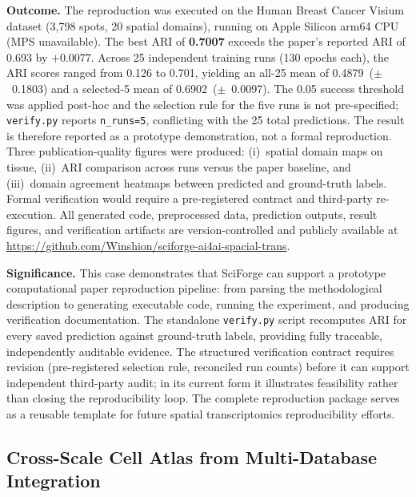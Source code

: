 \documentclass[sn-basic,Numbered,pdflatex]{sn-jnl}
\begin{document}
\textbf{Outcome.} The reproduction was executed on the Human Breast Cancer Visium dataset (3,798 spots, 20 spatial domains), running on Apple Silicon arm64 CPU (MPS unavailable). The best ARI of \textbf{0.7007} exceeds the paper's reported ARI of 0.693 by $+$0.0077. Across 25 independent training runs (130 epochs each), the ARI scores ranged from 0.126 to 0.701, yielding an all-25 mean of 0.4879~($\pm$~0.1803) and a selected-5 mean of 0.6902~($\pm$~0.0097). The 0.05 success threshold was applied post-hoc and the selection rule for the five runs is not pre-specified; \texttt{verify.py} reports \texttt{n\_runs=5}, conflicting with the 25 total predictions. The result is therefore reported as a prototype demonstration, not a formal reproduction. Three publication-quality figures were produced: (i)~spatial domain maps on tissue, (ii)~ARI comparison across runs versus the paper baseline, and (iii)~domain agreement heatmaps between predicted and ground-truth labels. Formal verification would require a pre-registered contract and third-party re-execution. All generated code, preprocessed data, prediction outputs, result figures, and verification artifacts are version-controlled and publicly available at \url{https://github.com/Winshion/sciforge-ai4ai-spacial-trans}.

\textbf{Significance.} This case demonstrates that SciForge can support a prototype computational paper reproduction pipeline: from parsing the methodological description to generating executable code, running the experiment, and producing verification documentation. The standalone \texttt{verify.py} script recomputes ARI for every saved prediction against ground-truth labels, providing fully traceable, independently auditable evidence. The structured verification contract requires revision (pre-registered selection rule, reconciled run counts) before it can support independent third-party audit; in its current form it illustrates feasibility rather than closing the reproducibility loop. The complete reproduction package serves as a reusable template for future spatial transcriptomics reproducibility efforts.


\subsection{Cross-Scale Cell Atlas from Multi-Database Integration}
\end{document}
